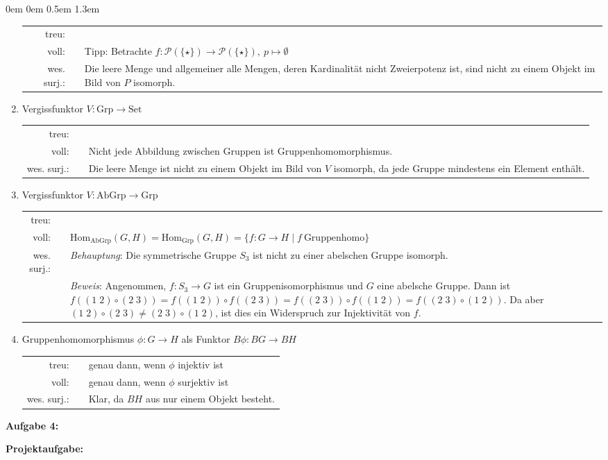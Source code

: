 \documentclass[a4paper,ngerman]{scrartcl}
\newcommand{\cmark}{\ding{51}}
\newcommand{\xmark}{\ding{55}}
\theoremstyle{definition}
\theoremstyle{plain}
\theoremstyle{remark}
\newcommand{\Hom}{\mathrm{Hom}}
\newcommand{\Set}{\mathrm{Set}}
\newcommand{\Grp}{\mathrm{Grp}}
\newcommand{\AbGrp}{\mathrm{AbGrp}}
\begin{document}
\begin{list}{}{0em \leftmargin0em \itemindent0.5em \itemsep 1.3em}
\begin{enumerate}
\setlength{\tabcolsep}{3pt}
\begin{tabular}{ r c p{12cm} }
  treu: & \cmark &\\
  voll: & \xmark & Tipp: Betrachte $f:\mathcal{P}(\{\star\}) \to \mathcal{P}(\{\star\}),\ p \mapsto \emptyset$\\
  wes. surj.: & \xmark & Die leere Menge und allgemeiner alle Mengen, deren Kardinalität nicht Zweierpotenz ist, sind nicht zu einem Objekt im Bild von $P$ isomorph.
\end{tabular}

\item Vergissfunktor $V : \Grp \to \Set$

\begin{tabular}{ r c p{12cm} }
  treu: & \cmark &\\
  voll: & \xmark & Nicht jede Abbildung zwischen Gruppen ist Gruppenhomomorphismus.\\
  wes. surj.: & \xmark & Die leere Menge ist nicht zu einem Objekt im Bild von $V$ isomorph, da jede Gruppe mindestens ein Element enthält.
\end{tabular}

\item Vergissfunktor $V : \AbGrp \to \Grp$

\begin{tabular}{ r c p{12cm} }
  treu: & \cmark &\\
  voll: & \cmark &$\Hom_\AbGrp(G, H) = \Hom_\Grp(G, H) = \{ f : G \to H \mid f\ \text{Gruppenhomo} \}$\\
  wes. surj.: & \xmark & \emph{Behauptung}: Die symmetrische Gruppe $S_3$ ist nicht zu einer abelschen Gruppe isomorph.\\
  & & \emph{Beweis}: Angenommen, $f:S_3 \to G$ ist ein Gruppenisomorphismus und $G$ eine abelsche Gruppe. Dann ist $f((1\;2) \circ (2\;3)) = f((1\;2)) \circ f((2\;3)) = f((2\;3)) \circ f((1\;2)) = f((2\;3) \circ (1\;2))$. Da aber $(1\;2) \circ (2\;3) \ne (2\;3) \circ (1\;2)$, ist dies ein Widerspruch zur Injektivität von $f$.
\end{tabular}

\item Gruppenhomomorphismus $\phi : G \to H$ als Funktor $B\phi : BG \to BH$

\begin{tabular}{ r c p{12cm} }
  treu: & & genau dann, wenn $\phi$ injektiv ist\\
  voll: & & genau dann, wenn $\phi$ surjektiv ist\\
  wes. surj.: & \cmark & Klar, da $BH$ aus nur einem Objekt besteht.
\end{tabular}
\end{enumerate}

\item[\textbf{Aufgabe 4:}]

\item[\textbf{Projektaufgabe:}]

\end{list}
\end{document}

